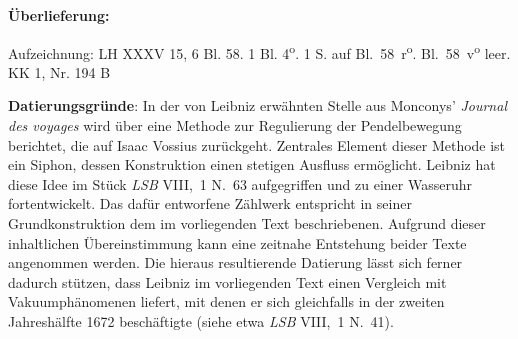       
               
                \begin{ledgroupsized}[r]{120mm}
                \footnotesize 
                \pstart                
                \noindent\textbf{\"{U}berlieferung:}   
                \pend
                \end{ledgroupsized}
            
              
                            \begin{ledgroupsized}[r]{114mm}
                            \footnotesize 
                            \pstart \parindent -6mm
                             Aufzeichnung: LH XXXV 15,  6 Bl. 58. 1 Bl. 4\textsuperscript{o}. 1 S. auf Bl.~58~r\textsuperscript{o}.
Bl.~58~v\textsuperscript{o} leer.  \\KK 1, Nr. 194 B \pend
                            \end{ledgroupsized}
                \vspace*{5mm}
                \begin{ledgroup}
                \footnotesize 
                \pstart
            \noindent\footnotesize{\textbf{Datierungsgr\"{u}nde}: In der von Leibniz erw\"{a}hnten Stelle aus Monconys' \textit{Journal des voyages}\cite{00118}
wird \"{u}ber eine Methode zur Regulierung der Pendelbewegung berichtet, die auf Isaac Vossius zur\"{u}ckgeht.
Zentrales Element dieser Methode ist ein Siphon, dessen Konstruktion einen stetigen Ausfluss erm\"{o}glicht.
Leibniz hat diese Idee im Stück \cite{00269}\textit{LSB} VIII,~1 N.~63 aufgegriffen und zu einer Wasseruhr fortentwickelt.
Das daf\"{u}r entworfene Z\"{a}hlwerk entspricht in seiner Grundkonstruktion dem im vorliegenden Text beschriebenen.
Aufgrund dieser inhaltlichen \"{U}bereinstimmung kann eine zeitnahe Entstehung beider Texte angenommen werden.
Die hieraus resultierende Datierung lässt sich ferner dadurch st\"{u}tzen,
dass Leibniz im vorliegenden Text einen Vergleich mit Vakuumph\"{a}nomenen liefert,
mit denen er sich gleichfalls in der zweiten Jahresh\"{a}lfte 1672 beschäftigte (siehe etwa \cite{01190}\textit{LSB} VIII,~1 N.~41).}
                \pend
                \end{ledgroup}
            
